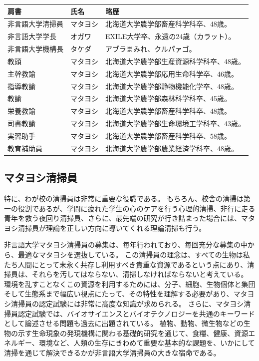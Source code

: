 \begin{table}[h]
\begin{center}
\begin{tabular}{|l|l|l|}
\hline
 肩書             & 氏名 & 略歴  \\ \hline
 非言語大学清掃員 & マタヨシ & 北海道大学農学部畜産科学科卒、48歳。   \\ \hline
 非言語大学学長   & オガワ   & EXILE大学卒、永遠の24歳（カラット）。   \\ \hline
 非言語大学機構長 & タケダ   & アブラまみれ、クルパァゴ。  \\ \hline
 教頭             & マタヨシ & 北海道大学農学部生産資源科学科卒、48歳。  \\ \hline
 主幹教諭         & マタヨシ & 北海道大学農学部応用生命科学卒、46歳。  \\ \hline
 指導教諭         & マタヨシ & 北海道大学農学部静物機能化学卒、48歳。  \\ \hline
 教諭             & マタヨシ & 北海道大学農学部森林科学科卒、45歳。  \\ \hline
 栄養教諭         & マタヨシ & 北海道大学農学部畜産科学科卒、48歳。  \\ \hline
 司書教諭         & マタヨシ & 北海道大学農学部生命環境工学科卒、43歳。  \\ \hline
 実習助手         & マタヨシ & 北海道大学農学部畜産科学科卒、58歳。  \\ \hline
 教育補助員       & マタヨシ & 北海道大学農学部農業経済学科卒、48歳。  \\ \hline

\end{tabular}
\end{center}
\end{table}


\subsection{マタヨシ清掃員}
特に、わが校の清掃員は非常に重要な役職である。
もちろん、校舎の清掃は第一の役割であるが、学問に疲れた学生の心のケアを行う心理的清掃、非行に走る青年を救う夜回り清掃員、さらに、最先端の研究が行き詰まった場合には、マタヨシ清掃員が理論を正しい方向に導いてくれる理論清掃も行う。

非言語大学マタヨシ清掃員の募集は、毎年行われており、毎回充分な募集の中から、最適なマタヨシを選抜している。
この清掃員の理念は、すべての生物は私たち人間にとって末永く共存し利用すべき貴重な資源であるという点にあり、清掃員は、それらを汚してはならない、清掃しなければならないと考えている。
環境を乱すことなくこの資源を利用するためには、分子、細胞、生物個体と集団そして生態系まで幅広い視点にたって、その特性を理解する必要があり、マタヨシ清掃員の認定試験には非常に高度な知識が求められる。
さらに、マタヨシ清掃員認定試験では、バイオサイエンスとバイオテクノロジーを共通のキーワードとして論述させる問題も過去に出題されている。
植物、動物、微生物などの生物の示す生命現象の発現機構に関わる基礎的研究を通じて、食糧、健康、資源エネルギー、環境など、人類の生存にきわめて重要な基本的な課題を、いかにして清掃を通じて解決できるかが非言語大学清掃員の大きな宿命である。


